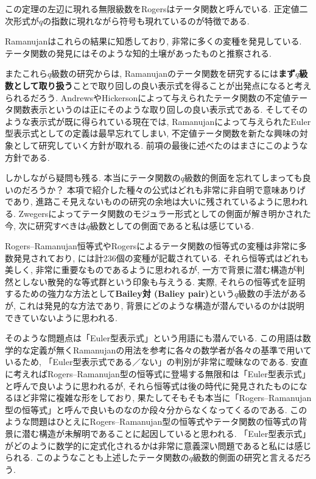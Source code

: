 \documentclass[11pt,b5paper,oneside,lualatex]{ltjsarticle} %
\numberwithin{equation}{section} %
\begin{document}
この定理の左辺に現れる無限級数をRogersはテータ関数と呼んでいる. 
正定値二次形式が$ q $の指数に現れながら符号も現れているのが特徴である. 

Ramanujanはこれらの結果に知悉しており, 非常に多くの変種を発見している. 
テータ関数の発見にはそのような知的土壌があったものと推察される. 

またこれら$ q $級数の研究からは, Ramanujanのテータ関数を研究するには\textbf{まず$ q $級数として取り扱う}ことで取り回しの良い表示式を得ることが出発点になると考えられるだろう. 
AndrewsやHickersonによって与えられたテータ関数の不定値テータ関数表示というのは正にそのような取り回しの良い表示式である. 
そしてそのような表示式が既に得られている現在では, Ramanujanによって与えられたEuler型表示式としての定義は最早忘れてしまい, 不定値テータ関数を新たな興味の対象として研究していく方針が取れる. 
前項の最後に述べたのはまさにこのような方針である. 

しかしながら疑問も残る. 
本当にテータ関数の$ q $級数的側面を忘れてしまっても良いのだろうか？
本項で紹介した種々の公式はどれも非常に非自明で意味ありげであり, 進路こそ見えないものの研究の余地は大いに残されているように思われる. 
Zwegersによってテータ関数のモジュラー形式としての側面が解き明かされた今, 次に研究すべきは$ q $級数としての側面であると私は感じている. 

\begin{rem}
	Rogers--Ramanujan恒等式やRogersによるテータ関数の恒等式の変種は非常に多数発見されており, \cite[付録A]{魅惑}には計236個の変種が記載されている. 
	それら恒等式はどれも美しく, 非常に重要なものであるように思われるが, 一方で背景に潜む構造が判然としない散発的な等式群という印象も与えうる. 
	実際, それらの恒等式を証明するための強力な方法として\textbf{Bailey対 (Baliey pair)}という$ q $級数の手法があるが, これは発見的な方法であり, 背景にどのような構造が潜んでいるのかは説明できていないように思われる. 
	
	そのような問題点は「Euler型表示式」という用語にも潜んでいる. 
	この用語は数学的な定義が無くRamanujanの用法を参考に各々の数学者が各々の基準で用いているため, 「Euler型表示式である／ない」の判別が非常に曖昧なのである. 
	安直に考えればRogers--Ramanujan型の恒等式に登場する無限和は「Euler型表示式」と呼んで良いように思われるが, それら恒等式は後の時代に発見されたものになるほど非常に複雑な形をしており, 果たしてそもそも本当に「Rogers--Ramanujan型の恒等式」と呼んで良いものなのか段々分からなくなってくるのである. 
	このような問題はひとえにRogers--Ramanujan型の恒等式やテータ関数の恒等式の背景に潜む構造が未解明であることに起因していると思われる. 
	「Euler型表示式」がどのように数学的に定式化されるかは非常に意義深い問題であると私には感じられる. 
	このようなことも上述したテータ関数の$ q $級数的側面の研究と言えるだろう. 
\end{rem}
\end{document}
